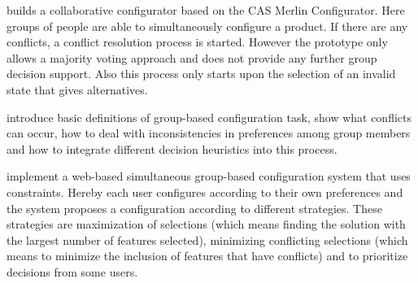 \begin{description}[style=unboxed, leftmargin=0cm, font=\normalfont]
    \item[\citeauthor{raabKollaborativeProduktkonfigurationEchtzeit2019} \cite{raabKollaborativeProduktkonfigurationEchtzeit2019}] builds a collaborative configurator based on the CAS Merlin Configurator. Here groups of people are able to simultaneously configure a product. If there are any conflicts, a conflict resolution process is started. However the prototype only allows a majority voting approach and does not provide any further group decision support. Also this process only starts upon the selection of an invalid state that gives alternatives.

    \item[\citeauthor{felferningGroupBasedConfiguration2016} \cite{felferningGroupBasedConfiguration2016}] introduce basic definitions of group-based configuration task, show what conflicts can occur, how to deal with inconsistencies in preferences among group members and how to integrate different decision heuristics into this process.

    \item[\citeauthor{velasquez-guevaraMultiSPLOTSupportingMultiuser2018} \cite{velasquez-guevaraMultiSPLOTSupportingMultiuser2018}] implement a web-based simultaneous group-based configuration system that uses constraints. Hereby each user configures according to their own preferences and the system proposes a configuration according to different strategies. These strategies are maximization of selections (which means finding the solution with the largest number of features selected), minimizing conflicting selections (which means to minimize the inclusion of features that have conflicts) and to prioritize decisions from some users.
\end{description}

